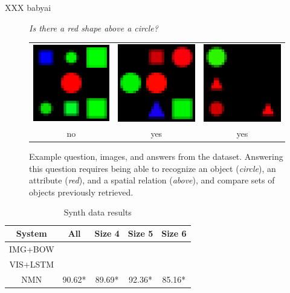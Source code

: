 XXX babyai

\begin{figure}
  \centering
  \emph{Is there a red shape above a circle?} \\[1em]
  \begin{tabular}{ccc}
    \includegraphics[width=0.25\columnwidth]{fig/shapes1_big} &
    \includegraphics[width=0.25\columnwidth]{fig/shapes2_big} &
    \includegraphics[width=0.25\columnwidth]{fig/shapes3_big} \\
    no & yes & yes
  \end{tabular}
  \caption{Example question, images, and answers from the \shapes dataset.
    Answering this question requires being able to recognize an object
    (\emph{circle}), an attribute (\emph{red}), and a spatial relation
    (\emph{above}), and compare sets of objects previously retrieved.}
\end{figure}



\begin{table}
  \footnotesize
  \centering
  \begin{tabular}{ccccc}
    \toprule
    System & All & Size 4 & Size 5 & Size 6 \\
    \midrule
    IMG+BOW & \\
    VIS+LSTM &  \\
    NMN & 90.62* & 89.69* & 92.36* & 85.16* \\
    \bottomrule
  \end{tabular}
  \caption{Synth data results}
\end{table}

